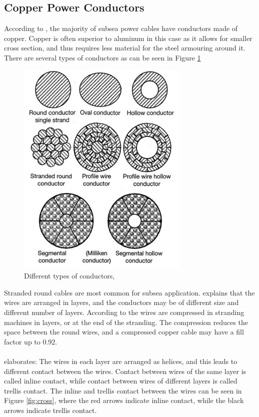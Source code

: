 \subsection{Copper Power Conductors}
  According to \cite{Worzyk}, the majority of subsea power cables have conductors made of copper. Copper is often superior to aluminum in this case as it allows for smaller cross section, and thus requires less material for the steel armouring around it. There are several  types of conductors as can be seen in Figure \ref{fig:conductors}
  \begin{figure}[H]
\centering
\includegraphics[scale=0.6]{figures/conductors}
\caption[$\; \:$Different types of conductors]{Different types of conductors, \cite{Worzyk} }
 \label{fig:conductors}
\end{figure}
 Stranded round cables are most common for subsea application. \cite{Nasution2013} explains that the wires are arranged in layers, and the conductors may be of different size and different number of layers. According to \cite{Worzyk} the wires are compressed in stranding machines in layers, or at the end of the stranding. The compression reduces the space between the round wires, and a compressed copper cable may have a fill factor up to 0.92. 
  \\\\
 \cite{Nasution2013} elaborates: The wires in each layer are arranged as helices, and this leads to different contact between the wires. Contact between wires of the same layer is called inline contact, while contact between wires of different layers is called trellis contact. The inline and trellis contact between the wires can be seen in Figure \ref{fig:cross}, where the red arrows indicate inline contact, while the black arrows indicate trellis contact. 
